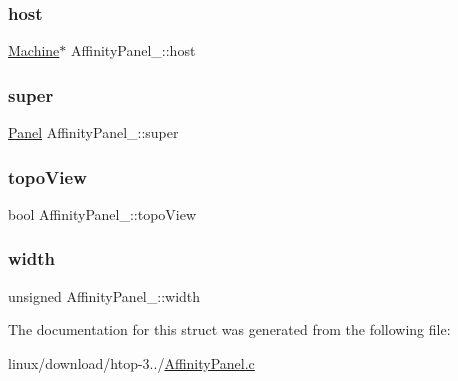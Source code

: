 \subsubsection{\texorpdfstring{host}{host}}
{\footnotesize\ttfamily \hyperlink{Machine_8h_aa3706f95e4706b9d02979efcabb1341d}{Machine}$\ast$ Affinity\+Panel\+\_\+\+::host}

\mbox{\label{structAffinityPanel___a00cd78bcdde51b85f2c19aee0a0fa181}} 
\subsubsection{\texorpdfstring{super}{super}}
{\footnotesize\ttfamily \hyperlink{Panel_8h_a034d4c16521db412dc7a1e8536d16fae}{Panel} Affinity\+Panel\+\_\+\+::super}

\mbox{\label{structAffinityPanel___a720a60029febdaff582eb0808416d375}} 
\subsubsection{\texorpdfstring{topo\+View}{topoView}}
{\footnotesize\ttfamily bool Affinity\+Panel\+\_\+\+::topo\+View}

\mbox{\label{structAffinityPanel___ac3223519e695c7a458eebb870541edc7}} 
\subsubsection{\texorpdfstring{width}{width}}
{\footnotesize\ttfamily unsigned Affinity\+Panel\+\_\+\+::width}



The documentation for this struct was generated from the following file\+:\begin{DoxyCompactItemize}
\item 
linux/download/htop-\/3../\hyperlink{AffinityPanel_8c}{Affinity\+Panel.\+c}\end{DoxyCompactItemize}

